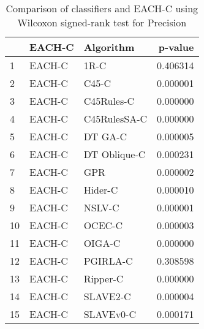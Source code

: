 \begin{table}
\footnotesize
\caption{Comparison of classifiers and EACH-C using Wilcoxon signed-rank test for Precision}
\label{tab:EACH-C wilcoxon Precision comparison}
\begin{tabular}{lllr}
\hline
 & EACH-C & Algorithm & p-value \\
\hline
1 & EACH-C & 1R-C & 0.406314 \\
2 & EACH-C & C45-C & 0.000001 \\
3 & EACH-C & C45Rules-C & 0.000000 \\
4 & EACH-C & C45RulesSA-C & 0.000000 \\
5 & EACH-C & DT GA-C & 0.000005 \\
6 & EACH-C & DT Oblique-C & 0.000231 \\
7 & EACH-C & GPR & 0.000002 \\
8 & EACH-C & Hider-C & 0.000010 \\
9 & EACH-C & NSLV-C & 0.000001 \\
10 & EACH-C & OCEC-C & 0.000003 \\
11 & EACH-C & OIGA-C & 0.000000 \\
12 & EACH-C & PGIRLA-C & 0.308598 \\
13 & EACH-C & Ripper-C & 0.000000 \\
14 & EACH-C & SLAVE2-C & 0.000004 \\
15 & EACH-C & SLAVEv0-C & 0.000171 \\
\hline
\end{tabular}
\end{table}
